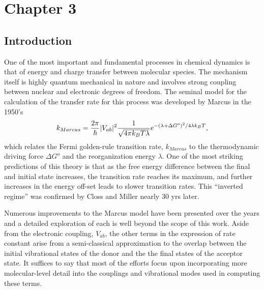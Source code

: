 \chapter{Chapter 3}

\section{Introduction}

One of the most important and fundamental processes in chemical  dynamics is
that of energy and charge transfer between molecular species.  The mechanism
itself is highly quantum mechanical in nature and involves strong coupling between nuclear and
electronic degrees of freedom.  The seminal model for the calculation of the transfer rate for this process
was developed by Marcus in the 1950's\cite{marcus1956theory,marcus1965theory,marcus1993electron}
\begin{equation}
k_{Marcus}=\frac{2\pi}{\hbar}|V_{ab}|^{2}\frac{1}{\sqrt{4\text{\ensuremath{\pi}}k_{B}T\lambda}}e^{-(\lambda+ \Delta G^{o})^{2}/4\text{\ensuremath{\lambda}}k_{B}T}\label{eq:marcus},
\end{equation}
which relates the Fermi golden-rule transition rate, $k_{Marcus}$
to the thermodynamic driving force $\Delta G^{o}$ and the reorganization energy $\lambda$.
One of the most striking predictions of this theory is that as the free energy difference between the final and initial state increases, the transition rate reaches its maximum,
and further increases in the energy off-set leads to slower transition rates.
This ``inverted regime''  was confirmed by Closs and Miller\cite{miller1984intramolecular,closs1988determination,closs1989connection}
nearly 30 yrs later.

Numerous improvements to the Marcus model have been presented over the years and
a detailed exploration of each is well beyond the scope of this work.
Aside from the electronic coupling, $V_{ab}$,  the other terms in the expression of rate constant arise from
a semi-classical approximation to the overlap between the initial vibrational states of the donor and the
the final  states of the acceptor state. It suffices to say that most of the
efforts focus upon incorporating more molecular-level detail into the couplings and vibrational modes
used in computing these terms.

